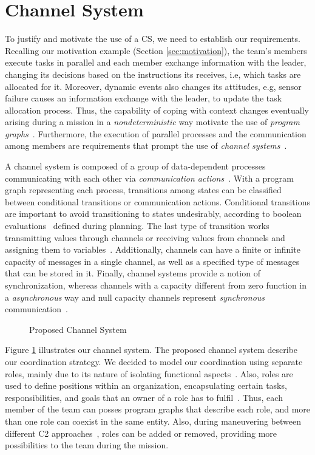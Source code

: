 \section{Channel System}
\label{sec:channelSystem}

To justify and motivate the use of a CS, we need to establish our requirements. Recalling our motivation example (Section \ref{sec:motivation}), the team's members execute tasks in parallel and each member exchange information with the leader, changing its decisions based on the instructions its receives, i.e, which tasks are allocated for it. Moreover, dynamic events also changes its attitudes, e.g, sensor failure causes an information exchange with the leader, to update the task allocation process. Thus, the capability of coping with context changes eventually arising during a mission in a \textit{nondeterministic} way motivate the use of \textit{program graphs}~\cite{modelcheckingBaier}. Furthermore, the execution of parallel processes and the communication among members are requirements that prompt the use of \textit{channel systems}~\cite{modelcheckingBaier}.

A channel system is composed of a group of data-dependent processes communicating with each other via \textit{communication actions}~\cite{modelcheckingBaier}. With a program graph representing each process, transitions among states can be classified between conditional transitions or communication actions. Conditional transitions are important to avoid transitioning to states undesirably, according to boolean evaluations~\cite{modelcheckingBaier} defined during planning. The last type of transition works transmitting values through channels or receiving values from channels and assigning them to variables~\cite{modelcheckingBaier}. Additionally, channels can have a finite or infinite capacity of messages in a single channel, as well as a specified type of messages that can be stored in it. Finally, channel systems provide a notion of synchronization, whereas channels with a capacity different from zero function in a \textit{asynchronous} way and null capacity channels represent \textit{synchronous} communication~\cite{modelcheckingBaier}.

\begin{figure}[!ht]
    \centering
    \scalebox{.75}{}
    \caption{Proposed Channel System}
    \label{fig:CS}
\end{figure}

Figure \ref{fig:CS} illustrates our channel system. The proposed channel system describe our coordination strategy. We decided to model our coordination using separate roles, mainly due to its nature of isolating functional aspects~\cite{roleOrientedModeling}. Also, roles are used to define positions within an organization, encapsulating certain tasks, responsibilities, and goals that an owner of a role has to fulfil~\cite{roleOrientedModeling}. Thus, each member of the team can posses program graphs that describe each role, and more than one role can coexist in the same entity. Also, during maneuvering between different C2 approaches~\cite{france2014}, roles can be added or removed, providing more possibilities to the team during the mission.

